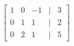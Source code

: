 \documentclass[preview]{standalone}
\begin{document}
\begin{align*}
\begin{bmatrix} 1 & 0 & -1 & | & 3 \\ 0 & 1 & 1 & | & 2 \\ 0 & 2 & 1 & | & 5 \end{bmatrix}
\end{align*}
\end{document}
